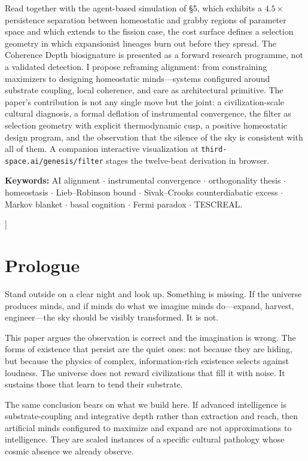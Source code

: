 \documentclass[11pt,twocolumn]{article}
\begin{document}
\begin{onecolabstract}
\smallskip
\noindent Read together with the agent-based simulation of \S 5,
which exhibits a $4.5\times$ persistence separation between
homeostatic and grabby regions of parameter space and which extends
to the fission case, the cost surface defines a selection geometry in
which expansionist lineages burn out before they spread. The
Coherence Depth biosignature is presented as a forward research
programme, not a validated detection. I propose reframing alignment:
from constraining maximizers to designing homeostatic minds—systems
configured around substrate coupling, local coherence, and care as
architectural primitive. The paper's contribution is not any single
move but the joint: a civilization-scale cultural diagnosis, a formal
deflation of instrumental convergence, the filter as selection
geometry with explicit thermodynamic cusp, a positive homeostatic
design program, and the observation that the silence of the sky is
consistent with all of them. A companion interactive visualization at
\texttt{third-space.ai/genesis/filter} stages the
twelve-beat derivation in browser.

\medskip
\noindent\textbf{Keywords:} AI alignment \(\cdot\) instrumental convergence
\(\cdot\) orthogonality thesis \(\cdot\) homeostasis \(\cdot\) Lieb--Robinson
bound \(\cdot\) Sivak--Crooks counterdiabatic excess \(\cdot\) Markov blanket
\(\cdot\) basal cognition \(\cdot\) Fermi paradox \(\cdot\) TESCREAL.
\end{onecolabstract}
\bigskip
]

\clearpage

\section*{Prologue}

Stand outside on a clear night and look up. Something is missing. If the
universe produces minds, and if minds do what we imagine minds do—expand,
harvest, engineer—the sky should be visibly transformed. It is not.

This paper argues the observation is correct and the imagination is wrong.
The forms of existence that persist are the quiet ones: not because they are
hiding, but because the physics of complex, information-rich existence
selects against loudness. The universe does not reward civilizations that
fill it with noise. It sustains those that learn to tend their substrate.

The same conclusion bears on what we build here. If advanced intelligence is
substrate-coupling and integrative depth rather than extraction and reach,
then artificial minds configured to maximize and expand are not approximations
to intelligence. They are scaled instances of a specific cultural pathology
whose cosmic absence we already observe.
\end{document}
